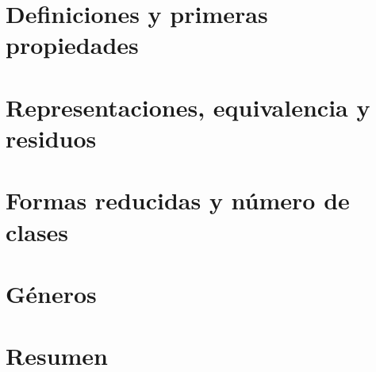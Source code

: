 \section{Definiciones y primeras propiedades}\label{sec:definiciones}


\section{Representaciones, equivalencia y residuos}\label{sec:representaciones}


\section{Formas reducidas y n\'umero de clases}\label{sec:reducidas}


\section{G\'eneros}\label{sec:generos}


\section{Resumen}\label{sec:resumen}


